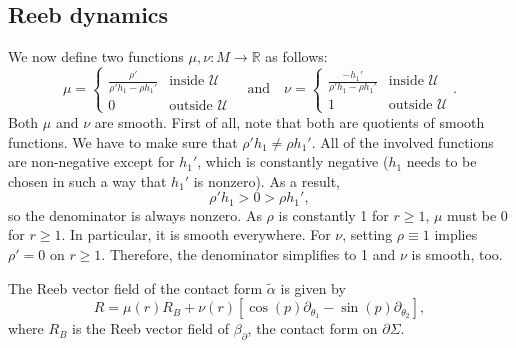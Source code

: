 \subsection{Reeb dynamics}\label{reeb_dynamics}
We now define two functions $\mu, \nu: M \to \mathbb R$ as follows:
\[
    \mu = \begin{cases}
        \frac{\rho'}{\rho' h_1 - \rho h_1'} &\text{inside } \mathcal{U}\\
        0 &\text{outside } \mathcal{U} 
    \end{cases}  
    \quad \text{and} \quad 
    \nu = \begin{cases}
        \frac{-h_1'}{\rho' h_1 - \rho h_1'} &\text{inside } \mathcal{U}\\
        1 &\text{outside } \mathcal{U}
    \end{cases}.
\]
Both $\mu$ and $\nu$ are smooth.
First of all, note that both are quotients of smooth functions.
We have to make sure that $\rho'h_1 \neq \rho h_1'$.
All of the involved functions are non-negative except for $h_1'$, which is constantly negative ($h_1$ needs to be chosen in such a way that $h_1'$ is nonzero). As a result,
\[
    \rho'h_1 > 0 > \rho h_1',
\]
so the denominator is always nonzero.
As $\rho$ is constantly 1 for $r \geq 1$, $\mu$ must be 0 for $r \geq 1$.
In particular, it is smooth everywhere. For $\nu$, setting $\rho \equiv 1$ implies $\rho' = 0$ on $r \geq 1$. Therefore, the denominator simplifies to 1 and $\nu$ is smooth, too.
\begin{lemma}
    The Reeb vector field of the contact form $\tilde \alpha$ is given by
    \[
        R = \mu(r)R_B + \nu(r)[\cos(p)\partial_{\theta_1} - \sin(p)\partial_{\theta_2}],
    \]
    where $R_B$ is the Reeb vector field of $\beta_\partial$, the contact form on $\partial \Sigma$.
\end{lemma}
